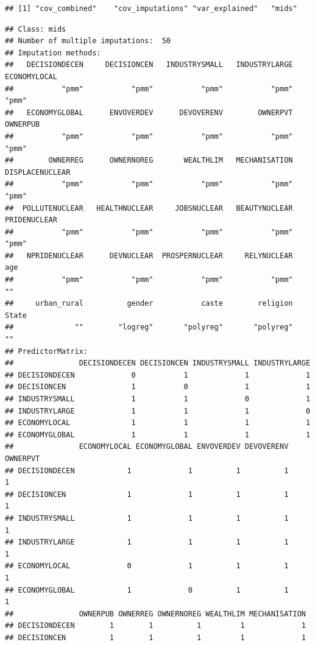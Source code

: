 \documentclass[
]{article}
\begin{document}
\begin{verbatim}
## [1] "cov_combined"    "cov_imputations" "var_explained"   "mids"
\end{verbatim}

\begin{verbatim}
## Class: mids
## Number of multiple imputations:  50 
## Imputation methods:
##   DECISIONDECEN     DECISIONCEN   INDUSTRYSMALL   INDUSTRYLARGE    ECONOMYLOCAL 
##           "pmm"           "pmm"           "pmm"           "pmm"           "pmm" 
##   ECONOMYGLOBAL      ENVOVERDEV      DEVOVERENV        OWNERPVT        OWNERPUB 
##           "pmm"           "pmm"           "pmm"           "pmm"           "pmm" 
##        OWNERREG      OWNERNOREG       WEALTHLIM   MECHANISATION DISPLACENUCLEAR 
##           "pmm"           "pmm"           "pmm"           "pmm"           "pmm" 
##  POLLUTENUCLEAR   HEALTHNUCLEAR     JOBSNUCLEAR   BEAUTYNUCLEAR    PRIDENUCLEAR 
##           "pmm"           "pmm"           "pmm"           "pmm"           "pmm" 
##   NPRIDENUCLEAR      DEVNUCLEAR  PROSPERNUCLEAR     RELYNUCLEAR             age 
##           "pmm"           "pmm"           "pmm"           "pmm"              "" 
##     urban_rural          gender           caste        religion           State 
##              ""        "logreg"       "polyreg"       "polyreg"              "" 
## PredictorMatrix:
##               DECISIONDECEN DECISIONCEN INDUSTRYSMALL INDUSTRYLARGE
## DECISIONDECEN             0           1             1             1
## DECISIONCEN               1           0             1             1
## INDUSTRYSMALL             1           1             0             1
## INDUSTRYLARGE             1           1             1             0
## ECONOMYLOCAL              1           1             1             1
## ECONOMYGLOBAL             1           1             1             1
##               ECONOMYLOCAL ECONOMYGLOBAL ENVOVERDEV DEVOVERENV OWNERPVT
## DECISIONDECEN            1             1          1          1        1
## DECISIONCEN              1             1          1          1        1
## INDUSTRYSMALL            1             1          1          1        1
## INDUSTRYLARGE            1             1          1          1        1
## ECONOMYLOCAL             0             1          1          1        1
## ECONOMYGLOBAL            1             0          1          1        1
##               OWNERPUB OWNERREG OWNERNOREG WEALTHLIM MECHANISATION
## DECISIONDECEN        1        1          1         1             1
## DECISIONCEN          1        1          1         1             1

\end{verbatim}
\end{document}
